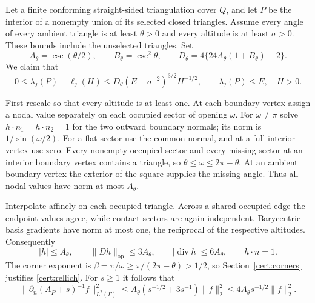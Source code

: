 \documentclass[11pt,reqno]{amsart}
\numberwithin{equation}{section}
\newcommand{\norm}[1]{\lVert#1\rVert}
\begin{document}
Let a finite conforming straight-sided triangulation cover
$\overline Q$, and let $P$ be the interior of a nonempty union
of its selected closed triangles.  Assume every angle of every
ambient triangle is at least $\theta>0$ and every altitude is
at least $\sigma>0$.  These bounds include the unselected
triangles.  Set
\begin{equation}\label{cert:triangle-constant}
 A_\theta=\csc(\theta/2),\qquad B_\theta=\csc^2\theta,\qquad
 D_\theta=4\{24A_\theta(1+B_\theta)+2\}.
\end{equation}
We claim that
\begin{equation}\label{cert:triangle-rate}
 0\le\lambda_j(P)-\ell_j(H)
 \le D_\theta(E+\sigma^{-2})^{3/2}H^{-1/2},
 \qquad \lambda_j(P)\le E,\quad H>0.
\end{equation}

First rescale so that every altitude is at least one.
At each boundary vertex assign a nodal value separately on
each occupied sector of opening $\omega$.  For $\omega\ne\pi$
solve $h\cdot n_1=h\cdot n_2=1$ for the two outward boundary
normals; its norm is $1/\sin(\omega/2)$.  For a flat sector use
the common normal, and at a full interior vertex use zero.
Every nonempty occupied sector and every missing sector at an
interior boundary vertex contains a triangle, so
$\theta\le\omega\le2\pi-\theta$.  At an ambient boundary vertex
the exterior of the square supplies the missing angle.
Thus all nodal values have norm at most $A_\theta$.

Interpolate affinely on each occupied triangle.  Across a shared
occupied edge the endpoint values agree, while contact sectors
are again independent.  Barycentric basis gradients have norm
at most one, the reciprocal of the respective altitudes.
Consequently
\[
 |h|\le A_\theta,\qquad \norm{Dh}_{\mathrm{op}}\le3A_\theta,
 \qquad|\operatorname{div}h|\le6A_\theta,\qquad h\cdot n=1.
\]
The corner exponent is
$\beta=\pi/\omega\ge\pi/(2\pi-\theta)>1/2$, so
Section~\ref{cert:corners} justifies \eqref{cert:rellich}.
For $s\ge1$ it follows that
\begin{equation}\label{cert:triangle-flux}
 \norm{\partial_n(A_P+s)^{-1}f}_{L^2(\Gamma)}^2
 \le A_\theta(s^{-1/2}+3s^{-1})\norm f_2^2
 \le4A_\theta s^{-1/2}\norm f_2^2 .
\end{equation}
\end{document}

